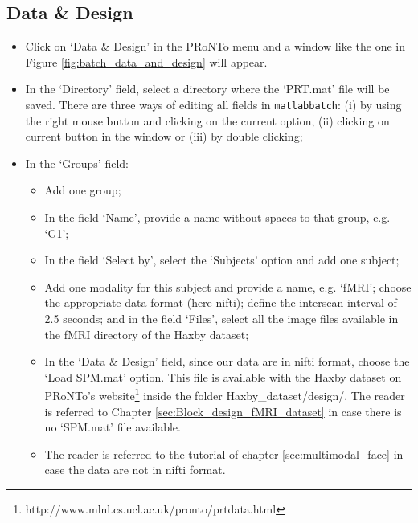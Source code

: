 
\subsection{Data \& Design}

\begin{itemize}

	\item Click on `Data \& Design' in the PRoNTo menu and a window like the one in Figure \ref{fig:batch_data_and_design} will appear.

	\item In the `Directory' field, select a directory where the `PRT.mat' file will be saved. There are three ways of editing all fields in {\tt matlabbatch}: (i) by using the right mouse button and clicking on the current option, (ii) clicking on current button in the window or (iii) by double clicking;
	
	\item In the `Groups' field:
 	
		\begin{itemize}
		
		\item Add one group;
		
		\item In the field `Name', provide a name without spaces to that group, e.g. `G1'; 
		
		\item In the field `Select by', select the `Subjects' option and add one subject;
		
		\item Add one modality for this subject and provide a name, e.g. `fMRI'; choose the appropriate data format (here nifti); define the interscan interval of 2.5 seconds; and in the field `Files', select all the image files available in the fMRI directory of the Haxby dataset;	
		
		\item In the `Data \& Design' field, since our data are in nifti format, choose the `Load SPM.mat' option. This file is available with the Haxby dataset on PRoNTo's website\footnote{http://www.mlnl.cs.ucl.ac.uk/pronto/prtdata.html} inside the folder Haxby\_dataset/design/. The reader is referred to Chapter \ref{sec:Block_design_fMRI_dataset} in case there is no `SPM.mat' file available.


        \item The reader is referred to the tutorial of chapter \ref{sec:multimodal_face} in case the data are not in nifti format.


\end{itemize}
\end{itemize}
